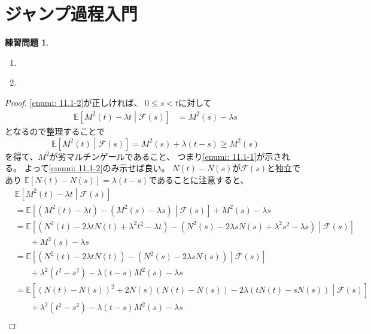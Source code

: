 \documentclass[uplatex]{jsarticle}
\theoremstyle{definition}
\newtheorem{prob}[prob]{練習問題}
\def\E{\mathbb{E}}
\def\mcF{\mathcal{F}}
\begin{document}
\newpage

\section{ジャンプ過程入門}\label{section: 11}


\begin{prob}\label{prob: 11.1}
  \begin{enumerate}
    \item \label{enumi: 11.1-1}
    \item \label{enumi: 11.1-2}
  \end{enumerate}
\end{prob}

\begin{proof}
  \ref{enumi: 11.1-2}が正しければ、
  \(0\leq s< t \)に対して
  \begin{align*}
    \E\left[ M^2(t)-\lambda t \middle| \mcF(s) \right]
    &= M^2(s) - \lambda s
  \end{align*}
  となるので整理することで
  \[
  \E\left[ M^2(t) \middle| \mcF(s) \right]
  = M^2(s) + \lambda (t-s) \geq M^2(s)
  \]
  を得て、\(M^2\)が劣マルチンゲールであること、
  つまり\ref{enumi: 11.1-1}が示される。
  よって\ref{enumi: 11.1-2}のみ示せば良い。
  \(N(t)-N(s)\)が\(\mcF(s)\)と独立であり
  \(\E[N(t)-N(s)]=\lambda(t-s)\)であることに注意すると、
  \begin{align*}
    &\E\left[ M^2(t)-\lambda t \middle| \mcF(s) \right] \\
    &= \E\left[ \left( M^2(t)-\lambda t \right)
    - \left( M^2(s) - \lambda s \right)\middle| \mcF(s) \right]
    + M^2(s) - \lambda s \\
    &= \E\left[ \left( N^2(t)-2\lambda t N(t)+\lambda^2 t^2 - \lambda t \right)
    - \left( N^2(s)-2\lambda s N(s)+\lambda^2 s^2 - \lambda s \right)
    \middle| \mcF(s) \right] \\
    &\ \ \ \ \ \ \ \
    + M^2(s) - \lambda s \\
    &= \E\left[ \left( N^2(t)-2\lambda t N(t) \right)
    - \left( N^2(s)-2\lambda s N(s) \right) \middle| \mcF(s) \right] \\
    &\ \ \ \ \ \ \ \
    + \lambda^2(t^2-s^2) - \lambda (t-s) M^2(s) - \lambda s \\
    &= \E\left[ \left( N(t) - N(s)\right)^2 + 2N(s)\left( N(t) - N(s) \right)
    - 2\lambda \left( tN(t) - sN(s) \right) \middle| \mcF(s) \right] \\
    &\ \ \ \ \ \ \ \
    + \lambda^2(t^2-s^2) - \lambda (t-s) M^2(s) - \lambda s \\

\end{align*}
\end{proof}
\end{document}
